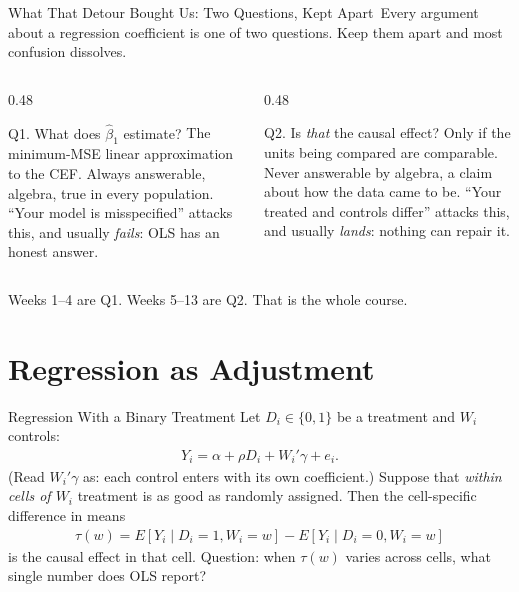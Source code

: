 \documentclass[aspectratio=169,11pt,xcolor=dvipsnames]{beamer}
\newcommand{\E}{E}
\newcommand{\core}{\,\raisebox{0.6pt}{\textcolor{corestar}{$\bigstar$}}}
\begin{document}
\begin{frame}{What That Detour Bought Us: Two Questions, Kept Apart\core}
Every argument about a regression coefficient is one of two questions. Keep them
apart and most confusion dissolves.
\vskip2pt
\begin{columns}[T]
\begin{column}{0.48\textwidth}
\begin{block}{Q1. What does $\hat\beta_1$ estimate?}
{\footnotesize
The minimum-MSE linear approximation to the CEF.
\vskip3pt
\alert{Always answerable}, algebra, true in every population.
\vskip3pt
``Your model is misspecified'' attacks this, and usually \emph{fails}: OLS has an
honest answer.}
\end{block}
\end{column}
\begin{column}{0.48\textwidth}
\begin{block}{Q2. Is \emph{that} the causal effect?}
{\footnotesize
Only if the units being compared are comparable.
\vskip3pt
\alert{Never answerable by algebra}, a claim about how the data came to be.
\vskip3pt
``Your treated and controls differ'' attacks this, and usually \emph{lands}:
nothing can repair it.}
\end{block}
\end{column}
\end{columns}
\vskip6pt
\pause
\alert{Weeks 1--4 are Q1. Weeks 5--13 are Q2.} That is the whole course.
\end{frame}

\section[Adjustment]{Regression as Adjustment}
\begin{frame}\sectionpage\end{frame}

\begin{frame}{Regression With a Binary Treatment}
Let $D_i\in\{0,1\}$ be a treatment and $W_i$ controls:
\begin{align*}
  Y_i = \alpha + \rho D_i + W_i'\gamma + e_i .
\end{align*}
{\footnotesize (Read $W_i'\gamma$ as: each control enters with its own
coefficient.)}
Suppose that \emph{within cells of $W_i$} treatment is as good as randomly
assigned. Then the cell-specific difference in means
\begin{align*}
  \tau(w) = \E[Y_i \mid D_i=1, W_i=w] - \E[Y_i\mid D_i = 0, W_i = w]
\end{align*}
is the causal effect in that cell.
\vskip4pt
\alert{Question}: when $\tau(w)$ varies across cells, what single number does OLS
report?
\end{frame}
\end{document}
